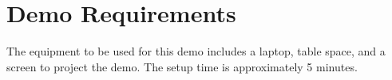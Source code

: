 \section{Demo Requirements}
The equipment to be used for this demo includes a laptop, table space, and a screen to project the demo. The setup time is approximately 5 minutes.